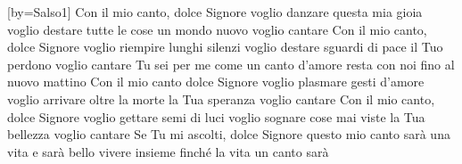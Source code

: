 [by={Salso1}]
\beginverse
Con il mio canto, dolce Signore
voglio danzare questa mia gioia
voglio destare tutte le cose
un mondo nuovo voglio cantare
Con il mio canto, dolce Signore
voglio riempire lunghi silenzi
voglio destare sguardi di pace
il Tuo perdono voglio cantare
\endverse
\beginchorus
Tu sei per me come un canto d'amore
resta con noi fino al nuovo mattino
\endchorus
\beginverse
Con il mio canto dolce Signore
voglio plasmare gesti d'amore
voglio arrivare oltre la morte
la Tua speranza voglio cantare
Con il mio canto, dolce Signore
voglio gettare semi di luci
voglio sognare cose mai viste
la Tua bellezza voglio cantare
Se Tu mi ascolti, dolce Signore
questo mio canto sarà una vita
e sarà bello vivere insieme
finché la vita un canto sarà
\endverse
\endsong
